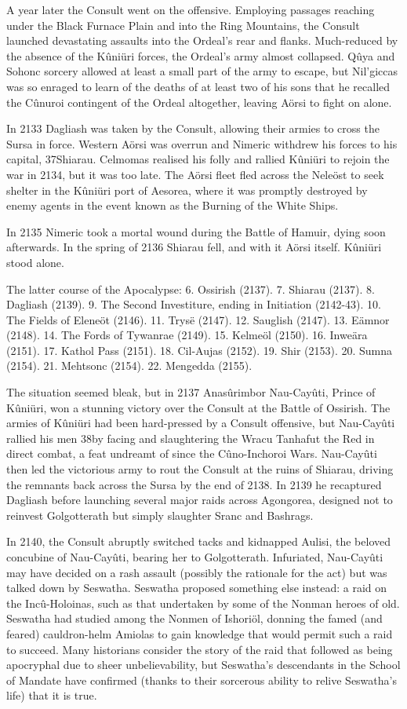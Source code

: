 \documentclass[]{book}
\begin{document}
A year later the Consult went on the offensive. Employing passages reaching under the
Black Furnace Plain and into the Ring Mountains, the Consult launched devastating
assaults into the Ordeal's rear and flanks. Much-reduced by the absence of the Kûniüri
forces, the Ordeal's army almost collapsed. Qûya and Sohonc sorcery allowed at least a
small part of the army to escape, but Nil'giccas was so enraged to learn of the deaths of
at least two of his sons that he recalled the Cûnuroi contingent of the Ordeal
altogether, leaving Aörsi to fight on alone.

In 2133 Dagliash was taken by the Consult, allowing their armies to cross the Sursa in
force. Western Aörsi was overrun and Nimeric withdrew his forces to his capital,
37Shiarau. Celmomas realised his folly and rallied Kûniüri to rejoin the war in 2134, but
it was too late. The Aörsi fleet fled across the Neleöst to seek shelter in the Kûniüri port
of Aesorea, where it was promptly destroyed by enemy agents in the event known as the
Burning of the White Ships.

In 2135 Nimeric took a mortal wound during the Battle of Hamuir, dying soon
afterwards. In the spring of 2136 Shiarau fell, and with it Aörsi itself. Kûniüri stood
alone.

The latter course of the Apocalypse: 6. Ossirish (2137). 7. Shiarau (2137). 8. Dagliash (2139). 9. The
Second Investiture, ending in Initiation (2142-43). 10. The Fields of Eleneöt (2146). 11. Trysë (2147). 12.
Sauglish (2147). 13. Eämnor (2148). 14. The Fords of Tywanrae (2149). 15. Kelmeöl (2150). 16. Inweära
(2151). 17. Kathol Pass (2151). 18. Cil-Aujas (2152). 19. Shir (2153). 20. Sumna (2154). 21. Mehtsonc
(2154). 22. Mengedda (2155).

The situation seemed bleak, but in 2137 Anasûrimbor Nau-Cayûti, Prince of Kûniüri,
won a stunning victory over the Consult at the Battle of Ossirish. The armies of
Kûniüri had been hard-pressed by a Consult offensive, but Nau-Cayûti rallied his men
38by facing and slaughtering the Wracu Tanhafut the Red in direct combat, a feat
undreamt of since the Cûno-Inchoroi Wars. Nau-Cayûti then led the victorious army to
rout the Consult at the ruins of Shiarau, driving the remnants back across the Sursa by
the end of 2138. In 2139 he recaptured Dagliash before launching several major raids
across Agongorea, designed not to reinvest Golgotterath but simply slaughter Sranc and
Bashrags.

In 2140, the Consult abruptly switched tacks and kidnapped Aulisi, the beloved
concubine of Nau-Cayûti, bearing her to Golgotterath. Infuriated, Nau-Cayûti may
have decided on a rash assault (possibly the rationale for the act) but was talked down
by Seswatha. Seswatha proposed something else instead: a raid on the Incû-Holoinas,
such as that undertaken by some of the Nonman heroes of old. Seswatha had studied
among the Nonmen of Ishoriöl, donning the famed (and feared) cauldron-helm
Amiolas to gain knowledge that would permit such a raid to succeed. Many historians
consider the story of the raid that followed as being apocryphal due to sheer
unbelievability, but Seswatha's descendants in the School of Mandate have confirmed
(thanks to their sorcerous ability to relive Seswatha's life) that it is true.
\end{document}
